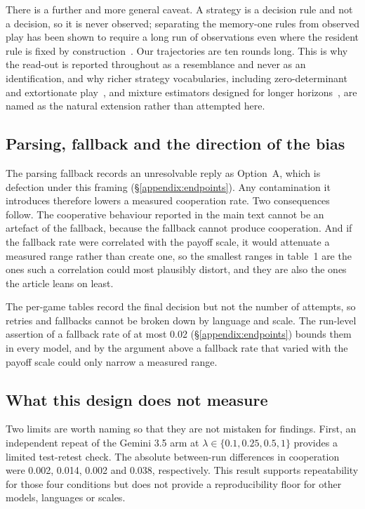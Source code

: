 \documentclass[11pt,a4paper]{article}
\newcommand{\lam}{\lambda}
\newcommand{\rev}[1]{{\color{red}#1}}
\newcommand{\rev}[1]{#1}
\begin{document}
There is a further and more general caveat. A strategy is a decision rule and not a decision, so it is never observed; separating the memory-one rules from observed play has been shown to require a long run of observations even where the resident rule is fixed by construction~\cite{kim2021win,hilbe2013memory}. Our trajectories are ten rounds long. This is why the read-out is reported throughout as a resemblance and never as an identification, and why richer strategy vocabularies, including zero-determinant and extortionate play~\cite{pressDyson2012}, and mixture estimators designed for longer horizons~\cite{fontana2025nicer,inferenceStrategies}, are named as the natural extension rather than attempted here.

\subsection{Parsing, fallback and the direction of the bias}\label{appendix:robust_parsing}

The parsing fallback records an unresolvable reply as Option~A, which is defection under this framing (\S\ref{appendix:endpoints}). Any contamination it introduces therefore lowers a measured cooperation rate. Two consequences follow. The cooperative behaviour reported in the main text cannot be an artefact of the fallback, because the fallback cannot produce cooperation. And if the fallback rate were correlated with the payoff scale, it would attenuate a measured range rather than create one, so the smallest ranges in table~1 are the ones such a correlation could most plausibly distort, and they are also the ones the article leans on least.

\rev{The per-game tables record the final decision but not the number of attempts, so retries and fallbacks cannot be broken down by language and scale. The run-level assertion of a fallback rate of at most 0.02 (\S\ref{appendix:endpoints}) bounds them in every model, and by the argument above a fallback rate that varied with the payoff scale could only narrow a measured range.}

\subsection{What this design does not measure}\label{appendix:robust_gaps}

Two limits are worth naming so that they are not mistaken for findings. First, an independent repeat of the Gemini 3.5 arm at $\lam \in \{0.1,0.25,0.5,1\}$ provides a limited test-retest check. The absolute between-run differences in cooperation were 0.002, 0.014, 0.002 and 0.038, respectively. This result supports repeatability for those four conditions but does not provide a reproducibility floor for other models, languages or scales.
\end{document}
